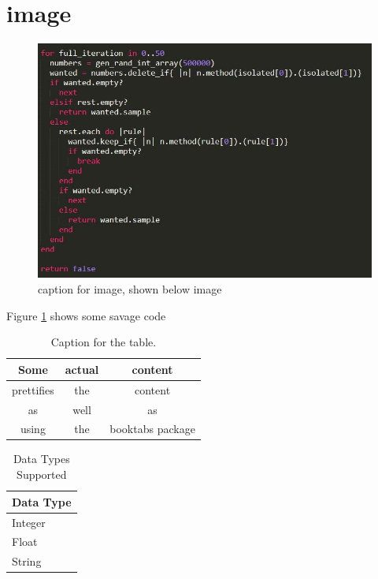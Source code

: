 \documentclass[a4paper,12pt]{article}
\begin{document}
\section{image}
\begin{figure}
\includegraphics[width=\linewidth]{screenshots/code-gen-int-pre_divisible_keep_if}
\caption{caption for image, shown below image}
\label{fig:code1}
\end{figure}
Figure \ref{fig:code1} shows some savage code

	
\begin{table}[h!]
\centering
\caption{Caption for the table.}
\label{tab:table1}
\begin{tabular}{ccc}
\toprule
Some & actual & content\\
\midrule
prettifies & the & content\\
as & well & as\\
using & the & booktabs package\\
\bottomrule
\end{tabular}
\end{table}

\begin{table}
\caption{Data Types Supported}
\label{tab:datatypessupported}
    \begin{tabular}{|l|}
        \hline
        Data Type \\ \hline
        Integer   \\ 
        Float     \\ 
        String    \\
        \hline
    \end{tabular}
\end{table}
\end{document}
